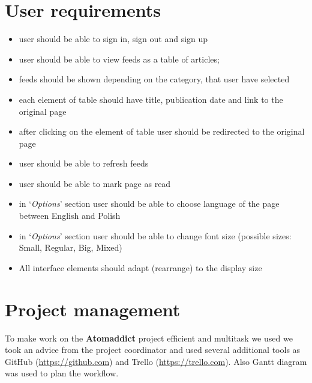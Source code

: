 \documentclass[12pt]{article}
\begin{document}
\section{User requirements}\label{user requirements}

\begin{itemize}

	\item user should be able to sign in, sign out and sign up

	\item user should be able to view feeds as a table of articles; 

	\item feeds should be shown depending on the category, that user have selected

	\item each element of table should have title, publication date and link to the original page

	\item after clicking on the element of table user should be redirected to the original page

	\item user should be able to refresh feeds

	\item user should be able to mark page as read

	\item in `\emph{Options}' section user should be able to choose language of the page between English and Polish

	\item in `\emph{Options}' section user should be able to change font size (possible sizes:  Small, Regular, Big, Mixed)

	\item All interface elements should adapt (rearrange) to the display size

\end{itemize}

\section{Project management}\label{project management}
To make work on the \textbf{Atomaddict} project efficient and multitask we used we took an advice from the project coordinator and used several additional tools as GitHub (\url{https://github.com}) and Trello (\url{https://trello.com}). Also Gantt diagram was used to plan the workflow.
\end{document}

